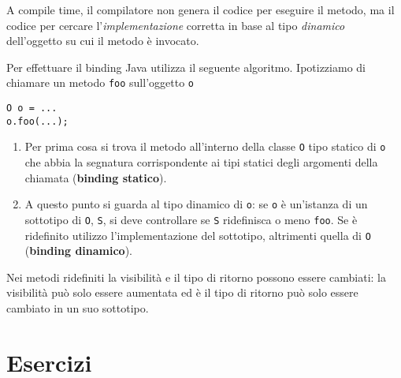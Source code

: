 \documentclass{article}
\begin{document}
A compile time, il compilatore non genera il codice per eseguire il metodo, ma il codice per cercare l'\emph{implementazione} corretta in base al tipo \emph{dinamico} dell'oggetto su cui il metodo \`e invocato.

Per effettuare il binding Java utilizza il seguente algoritmo.
Ipotizziamo di chiamare un metodo \texttt{foo} sull'oggetto \texttt{o}


\begin{lstlisting}
O o = ...
o.foo(...);
\end{lstlisting}

\begin{enumerate}
	\item Per prima cosa si trova il metodo all'interno della classe \texttt{O} tipo statico di \texttt{o} che abbia la segnatura corrispondente ai tipi statici degli argomenti della chiamata
	(\textbf{binding statico}).
	\item A questo punto si guarda al tipo dinamico di \texttt{o}: se 
	\texttt{o} è un'istanza di un sottotipo di \texttt{O}, \texttt{S}, si deve controllare
	se \texttt{S} ridefinisca o meno \texttt{foo}. Se è ridefinito utilizzo l'implementazione del
	sottotipo, altrimenti quella di \texttt{O} (\textbf{binding dinamico}).
\end{enumerate}

Nei metodi ridefiniti la visibilità e il tipo di ritorno possono essere cambiati: la visibilità
può solo essere aumentata ed è il tipo di ritorno può solo essere cambiato in un suo sottotipo.







\section{Esercizi}
\end{document}
